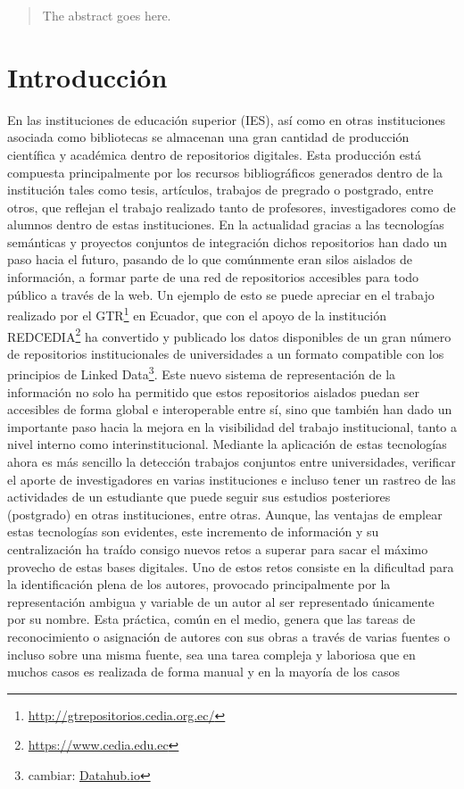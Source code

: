 \documentclass[conference]{IEEEtran}
\begin{document}
\maketitle


\begin{abstract}
The abstract goes here.
\end{abstract}

\IEEEpeerreviewmaketitle

\section{Introducción}
En las instituciones de educación superior (IES), así como en otras instituciones asociada como bibliotecas se almacenan una gran cantidad de producción científica y académica dentro de repositorios digitales. Esta producción está compuesta principalmente por los  recursos bibliográficos generados dentro de la institución tales como tesis, artículos, trabajos de pregrado o postgrado, entre otros, que reflejan el trabajo realizado tanto de profesores, investigadores como de alumnos dentro de estas instituciones. En la actualidad gracias a las tecnologías  semánticas y proyectos conjuntos de integración  dichos repositorios han dado un paso hacia el futuro, pasando de lo que comúnmente eran silos aislados de información, a formar parte de  una red de  repositorios accesibles para todo público a través de la web. Un ejemplo  de esto se puede apreciar en el trabajo realizado por el GTR\footnote{\url{http://gtrepositorios.cedia.org.ec/}} en Ecuador, que con el apoyo de la institución REDCEDIA\footnote{\url{https://www.cedia.edu.ec}} ha convertido y publicado los datos disponibles de un gran número de repositorios institucionales de universidades a un formato compatible con los  principios de Linked Data\footnote{cambiar: \url{Datahub.io}}. Este nuevo sistema de representación de  la información no solo  ha permitido que estos repositorios aislados  puedan ser accesibles de forma global e interoperable entre sí, sino que también  han dado un importante paso hacia la mejora en  la visibilidad  del trabajo institucional,  tanto a nivel interno  como interinstitucional. Mediante la aplicación de estas tecnologías ahora es más sencillo la detección trabajos conjuntos entre  universidades, verificar el aporte de investigadores en varias instituciones e incluso tener un rastreo de las actividades de un estudiante que puede seguir sus estudios posteriores (postgrado) en otras instituciones, entre otras.  Aunque, las ventajas de emplear estas tecnologías son evidentes, este incremento de información y su centralización ha traído consigo  nuevos retos a superar para sacar el máximo provecho de estas bases digitales. Uno de estos retos  consiste en  la dificultad para  la identificación plena de  los  autores,  provocado principalmente por la representación ambigua y variable de un autor al ser  representado únicamente por su nombre.   Esta práctica, común en el medio,  genera que las tareas de  reconocimiento o asignación  de autores con sus obras a través de varias fuentes o incluso sobre una misma fuente, sea una tarea compleja y laboriosa que en muchos casos es realizada de forma manual y en la mayoría de los casos  
\end{document}

